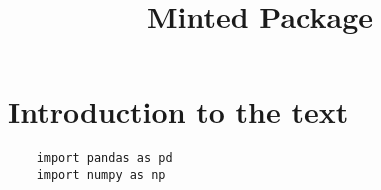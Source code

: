 \documentclass[12pt, twoside]{article}
\title{Minted Package}
\begin{document}
\maketitle

\begin{abstract}
	\lipsum[1]
\end{abstract}

\section{Introduction to the text}

\begin{verbatim}
	import pandas as pd
	import numpy as np
\end{verbatim}
\end{document}
